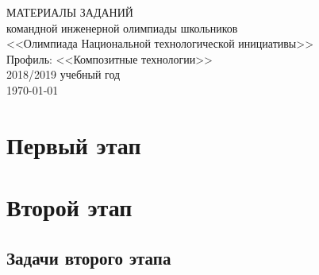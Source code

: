 \documentclass[a4paper,12pt,oneside]{book}
\begin{document}
\begin{titlepage}
    \begin{center}
        \huge{МАТЕРИАЛЫ ЗАДАНИЙ} \\
        \Large{командной инженерной олимпиады школьников} \\
        \Large{<<Олимпиада Национальной технологической инициативы>>} \\
        \Large{Профиль: <<Композитные технологии>>} \\
        \large{2018/2019 учебный год} \\
        \vspace{2cm}
        \Large{\today}  
    \end{center}
\end{titlepage}

\setcounter{tocdepth}{1}

\tableofcontents

\part{Первый этап}




\part{Второй этап}
\clearpage
\chapter{Задачи второго этапа}





%

%

%
%
\end{document}
